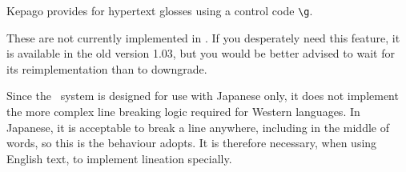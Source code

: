 %
%
%
    Kepago provides for hypertext glosses using a control code \lstinline|\g|.

    These are not currently implemented in \compiler.  If you desperately need
    this feature, it is available in the old \package{} version 1.03, but you
    would be better advised to wait for its reimplementation than to downgrade.

  \label{sec:lineation}

    Since the \reallive\ system is designed for use with Japanese only, it does
    not implement the more complex line breaking logic required for Western
    languages.  In Japanese, it is acceptable to break a line anywhere,
    including in the middle of words, so this is the behaviour \reallive{}
    adopts.  It is therefore necessary, when using English text, to implement
    lineation specially.

